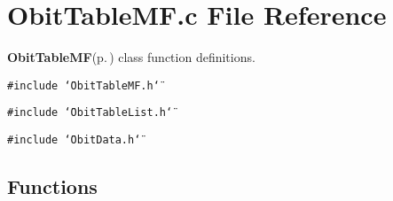 \section{Obit\-Table\-MF.c File Reference}
\label{ObitTableMF_8c}
{\bf Obit\-Table\-MF}{\rm (p.\,\pageref{structObitTableMF})} class function definitions. 

{\tt \#include \char`\"{}Obit\-Table\-MF.h\char`\"{}}\par
{\tt \#include \char`\"{}Obit\-Table\-List.h\char`\"{}}\par
{\tt \#include \char`\"{}Obit\-Data.h\char`\"{}}\par
\subsection*{Functions}
